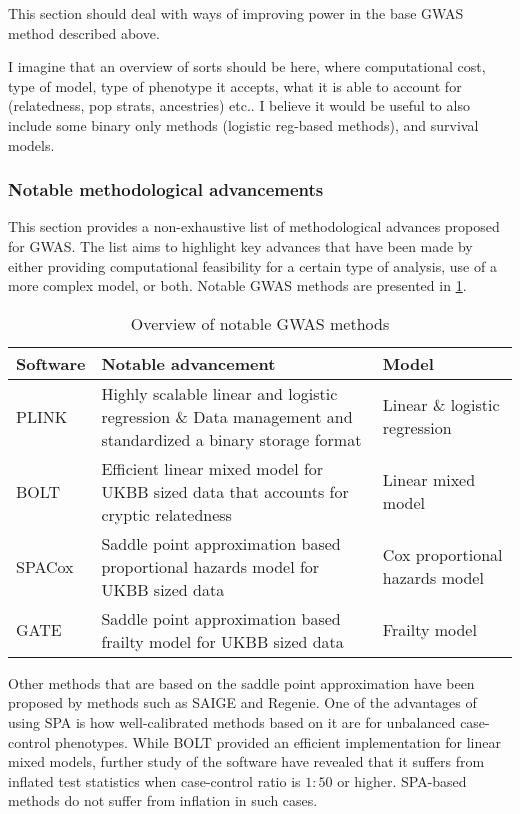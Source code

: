 This section should deal with ways of improving power in the base GWAS method described above.

I imagine that an overview of sorts should be here, where computational cost, type of model, type of phenotype it accepts, what it is able to account for (relatedness, pop strats, ancestries) etc.. I believe it would be useful to also include some binary only methods (logistic reg-based methods), and survival models.


\subsubsection{Notable methodological advancements}
This section provides a non-exhaustive list of methodological advances proposed for GWAS. The list aims to highlight key advances that have been made by either providing computational feasibility for a certain type of analysis, use of a more complex model, or both. Notable GWAS methods are presented in \cref{table:GWASoverview}. 

\begin{table}[h]
\centering
\begin{tabularx}{\textwidth}{l X l}
\hline
Software	&	Notable advancement		&	Model \\
\hline
PLINK\cite{chang2015second,purcell2007plink}	&
Highly scalable linear and logistic regression \& Data management and standardized a binary storage format	&
Linear \& logistic regression	\\
BOLT\cite{loh2015efficient}	&
Efficient linear mixed model for UKBB sized data that accounts for cryptic relatedness	&
Linear mixed model	\\
SPACox\cite{bi2020fast}	&	
Saddle point approximation based proportional hazards model for UKBB sized data &
Cox proportional hazards model \\
GATE\cite{dey2022efficient}	&
Saddle point approximation based frailty model for UKBB sized data	&
Frailty model \\
\hline
\end{tabularx}
\caption{Overview of notable GWAS methods}
\label{table:GWASoverview}
\end{table}
Other methods that are based on the saddle point approximation\cite{daniels1954saddlepoint,kuonen1999miscellanea} have been proposed by methods such as SAIGE\cite{zhou2018efficiently} and Regenie\cite{mbatchou2021computationally}. One of the advantages of using SPA is how well-calibrated methods based on it are for unbalanced case-control phenotypes. While BOLT provided an efficient implementation for linear mixed models, further study of the software have revealed that it suffers from inflated test statistics when case-control ratio is $ 1:50 $ or higher. SPA-based methods do not suffer from inflation in such cases\cite{mbatchou2021computationally}.





